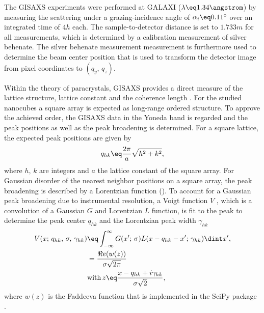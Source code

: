 \documentclass[\main/dresen_thesis.tex]{subfiles}
\begin{document}
      The GISAXS experiments were performed at GALAXI ($\lambda \eq 1.34 \angstrom$) by measuring the scattering under a grazing-incidence angle of $\alpha_i \eq 0.11^\circ$ over an integrated time of $4 \unit{h}$ each.
      The sample-to-detector distance is set to $1.733 \unit{m}$ for all measurements, which is determined by a calibration measurement of silver behenate.
      The silver behenate measurement measurement is furthermore used to determine the beam center position that is used to transform the detector image from pixel coordinates to $(q_y,\, q_z)$.

      Within the theory of paracrystals, GISAXS provides a direct measure of the lattice structure, lattice constant and the coherence length \cite{Renaud_2009_Probi}.
      For the studied nanocubes a square array is expected as long-range ordered structure.
      To approve the achieved order, the GISAXS data in the Yoneda band is regarded and the peak positions as well as the peak broadening is determined.
      For a square lattice, the expected peak positions are given by
      \begin{align}\label{eq:monolayers:preparation:solventVariation:squareLatticeIndices}
        q_{hk} \eq \frac{2 \pi}{a} \sqrt{h^2 + k^2},
      \end{align}
      where $h$, $k$ are integers and $a$ the lattice constant of the square array.
      For Gaussian disorder of the nearest neighbor positions on a square array, the peak broadening is described by a Lorentzian function ().
      To account for a Gaussian peak broadening due to instrumental resolution, a Voigt function $V$ \cite{Olver_2010_Handb}, which is a convolution of a Gaussian $G$ and Lorentzian $L$ function, is fit to the peak to determine the peak center $q_{hk}$ and the Lorentzian peak width $\gamma_{hk}$
      \begin{align}
        \begin{split}
          V(x;\,q_{hk},\,\sigma,\,\gamma_{hk}) &\eq \int_{-\infty}^\infty G(x^\prime;\,\sigma) L(x - q_{hk} - x^\prime;\, \gamma_{hk}) \dint x^\prime,\\
          &= \frac{\Re e (w(z))}{\sigma \sqrt{2 \pi}}\\
          &\mathrm{with\,} z\eq \frac{x - q_{hk} + i\gamma_{hk}}{\sigma \sqrt{2}},
        \end{split}
      \end{align}
      where $w(z)$ is the Faddeeva function that is implemented in the SciPy package \cite{Oliphant_2006_Guide}.
\end{document}
